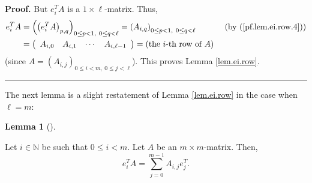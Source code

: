 \documentclass[numbers=enddot,12pt,final,onecolumn,notitlepage]{scrartcl}%
\theoremstyle{definition}
\newtheorem{lem}[theo]{Lemma}
\newenvironment{lemma}[1][]
{\begin{lem}[#1]\begin{leftbar}}
{\end{leftbar}\end{lem}}
\newenvironment{proof}[1][Proof]{\noindent\textbf{#1.} }{\ \rule{0.5em}{0.5em}}
\let\sumnonlimits\sum
\renewcommand{\sum}{\sumnonlimits\limits}
\newenvironment{verlong}{}{}
\begin{document}
\begin{verlong}
\begin{proof}
But $e_{i}^{T}A$ is a $1\times\ell$-matrix. Thus,%
\begin{align*}
e_{i}^{T}A  &  =\left(  \left(  e_{i}^{T}A\right)  _{p,q}\right)  _{0\leq
p<1,\ 0\leq q<\ell}=\left(  A_{i,q}\right)  _{0\leq p<1,\ 0\leq q<\ell
}\ \ \ \ \ \ \ \ \ \ \left(  \text{by (\ref{pf.lem.ei.row.4})}\right) \\
&  =\left(
\begin{array}
[c]{cccc}%
A_{i,0} & A_{i,1} & \cdots & A_{i,\ell-1}%
\end{array}
\right)  =\left(  \text{the }i\text{-th row of }A\right)
\end{align*}
(since $A=\left(  A_{i,j}\right)  _{0\leq i<m,\ 0\leq j<\ell}$). This proves
Lemma \ref{lem.ei.row}.
\end{proof}
\end{verlong}

The next lemma is a slight restatement of Lemma \ref{lem.ei.row} in the case
when $\ell=m$:

\begin{lemma}
\label{lem.ei.row2}Let $i\in\mathbb{N}$ be such that $0\leq i<m$. Let $A$ be
an $m\times m$-matrix. Then,%
\[
e_{i}^{T}A=\sum_{j=0}^{m-1}A_{i,j}e_{j}^{T}.
\]

\end{lemma}
\end{document}
